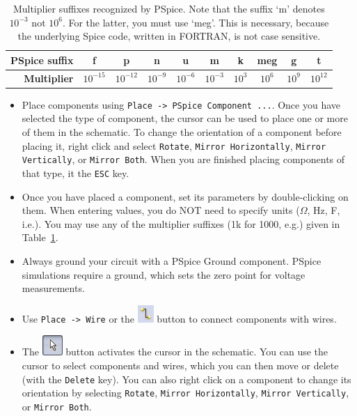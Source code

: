 \documentclass[11pt]{article}
\begin{document}
\begin{table}
  \begin{center}
    \begin{tabular}{|r|c|c|c|c|c|c|c|c|c|}\hline
      \textbf{PSpice suffix}
      & f         & p         & n
      & u         & m         & k
      & meg       & g         & t        \\\hline
      \textbf{Multiplier}
      & $10^{-15}$ & $10^{-12}$ & $10^{-9}$
      & $10^{-6}$ & $10^{-3}$  & $10^{3}$
      & $10^{6}$   & $10^{9}$  & $10^{12}$ \\\hline
    \end{tabular}
    \caption{Multiplier suffixes recognized by PSpice. Note that the
      suffix `m' denotes $10^{-3}$ not $10^{6}$. For the latter, you
      must use `meg'. This is necessary, because the underlying Spice
      code, written in FORTRAN, is not case sensitive.} 
    \label{tab:pspicemult}
  \end{center}
\end{table}

\begin{itemize}
\item Place components using \texttt{Place -> PSpice Component
  ...}. Once you have selected the type of component, the cursor can
  be used to place one or more of them in the schematic. To change the
  orientation of a component before placing it, right click and select
  \texttt{Rotate}, \texttt{Mirror Horizontally},
  \texttt{Mirror Vertically}, or \texttt{Mirror Both}.
  When you are finished placing components of that type, it the
  \texttt{ESC} key.

\item Once you have placed a component, set its parameters by
  double-clicking on them. When entering values, you do NOT need to
  specify units ($\Omega$, Hz, F, i.e.). You may use any of the
  multiplier suffixes (1k for 1000, e.g.) given in
  Table~\ref{tab:pspicemult}.

\item Always ground your circuit with a PSpice Ground
  component. PSpice simulations require a ground, which sets the zero
  point for voltage measurements.

\item Use \texttt{Place -> Wire} or the
  \includegraphics{Schematic_Wire.png} button to connect components
  with wires.

\item The \includegraphics{Schematic_Cursor.png} button activates the
  cursor in the schematic. You can use the cursor to select
  components and wires, which you can then move or delete (with the
  \texttt{Delete} key). You can also right click on a component to
  change its orientation by selecting \texttt{Rotate},
  \texttt{Mirror Horizontally}, \texttt{Mirror Vertically}, or
  \texttt{Mirror Both}.
\end{itemize}
\end{document}
